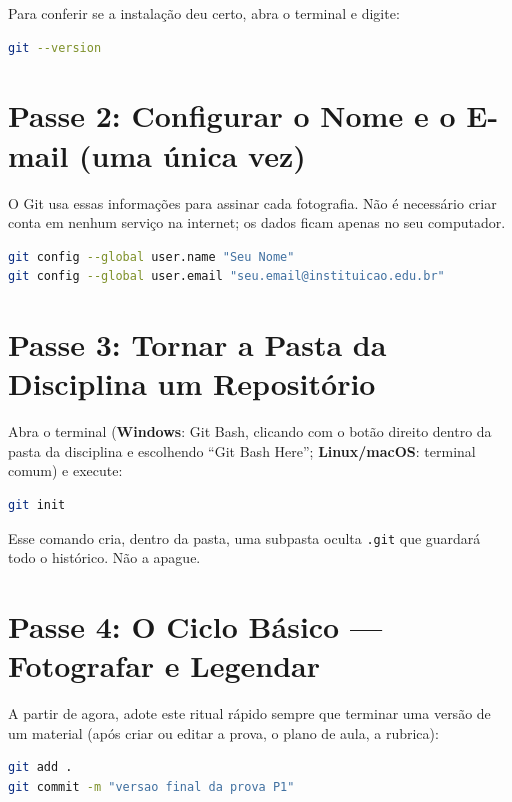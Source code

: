 Para conferir se a instala{\c c}{\~a}o deu certo, abra o terminal e digite:
\begin{lstlisting}[language=bash, caption={Verificando a instala{\c c}{\~a}o do Git}]
git --version
\end{lstlisting}

\section{Passe 2: Configurar o Nome e o E-mail (uma {\'u}nica vez)}

O Git usa essas informa{\c c}{\~o}es para assinar cada fotografia. N{\~a}o {\'e} necess{\'a}rio criar conta em nenhum servi{\c c}o na internet; os dados ficam apenas no seu computador.

\begin{lstlisting}[language=bash, caption={Configura{\c c}{\~a}o inicial do Git (nome e e-mail)}]
git config --global user.name "Seu Nome"
git config --global user.email "seu.email@instituicao.edu.br"
\end{lstlisting}

\section{Passe 3: Tornar a Pasta da Disciplina um Reposit{\'o}rio}

Abra o terminal (\textbf{Windows}: Git Bash, clicando com o bot{\~a}o direito dentro da pasta da disciplina e escolhendo ``Git Bash Here''; \textbf{Linux/macOS}: terminal comum) e execute:

\begin{lstlisting}[language=bash, caption={Criando o reposit{\'o}rio da disciplina}]
git init
\end{lstlisting}

Esse comando cria, dentro da pasta, uma subpasta oculta \texttt{.git} que guardar{\'a} todo o hist{\'o}rico. N{\~a}o a apague.

\section{Passe 4: O Ciclo B{\'a}sico — Fotografar e Legendar}

A partir de agora, adote este ritual r{\'a}pido sempre que terminar uma vers{\~a}o de um material (ap{\'o}s criar ou editar a prova, o plano de aula, a rubrica):

\begin{lstlisting}[language=bash, caption={Salvando uma nova vers{\~a}o (commit)}]
git add .
git commit -m "versao final da prova P1"
\end{lstlisting}

